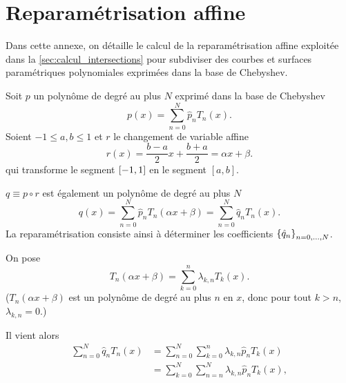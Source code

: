 \chapter{Reparamétrisation affine}%
\label{app:cdv_cheb}
%
%
\def\axpb{\alpha x + \beta}

Dans cette annexe, on détaille le calcul de la reparamétrisation affine exploitée dans la \autoref{sec:calcul_intersections} pour subdiviser des courbes et surfaces paramétriques polynomiales exprimées dans la base de Chebyshev.
\par\bigskip
Soit $p$ un polynôme de degré au plus $N$ exprimé dans la base de Chebyshev
\begin{equation*}
	p(x) = \sum_{n=0}^N \hat{p}_n T_n(x).
\end{equation*}
%
Soient $-1 \leq a, b \leq 1$ et $r$ le changement de variable affine
\begin{equation*}
	r(x) = \frac{b - a}{2}x + \frac{b + a}{2} = \axpb .
\end{equation*}
qui transforme le segment $\left[ -1, 1 \right]$ en le segment $\left[a,b\right]$.
\par
$q \equiv p \circ r$ est également un polynôme de degré au plus $N$
\begin{equation*}
	q(x) = \sum_{n=0}^N \hat{p}_n T_n(\axpb) 
	= \sum_{n=0}^N \hat{q}_n T_n(x).
\end{equation*}
La reparamétrisation consiste ainsi à déterminer les coefficients $\left\{{\hat{q}}_{n}\right\}_{{n}={0},\ldots,{N}}$.\par
%
On pose
\begin{equation}
	T_n(\axpb) = \sum_{k=0}^{n} \lambda_{k,n} T_k(x).
	\label{eq:combinaison_cdv}
\end{equation}
($T_n(\axpb)$ est un polynôme de degré au plus $n$ en $x$, donc pour tout $k > n$, $\lambda_{k,n} = 0$.)
\par
Il vient alors
\begin{align*}
	\sum_{n=0}^N \hat{q}_n T_n(x)
	&= \sum_{n=0}^N \sum_{k=0}^{n} \lambda_{k,n} \hat{p}_n T_k(x) \\
	&= \sum_{k=0}^N \sum_{n=n}^{N} \lambda_{k,n} \hat{p}_n T_k(x),
\end{align*}
